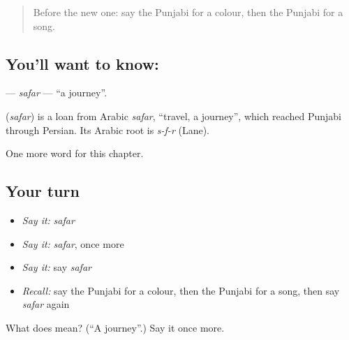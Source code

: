\label{lesson:PA-C97-safar}



\begin{quote}
Before the new one: say the Punjabi for a colour, then the Punjabi for a song.
\end{quote}

\subsection*{You'll want to know: }
\textbf{} — \emph{safar} — \textquotedblleft{}a journey\textquotedblright{}.

\begin{cousinweb}
\textbf{} (\emph{safar}) is a loan from Arabic \emph{safar}, \textquotedblleft{}travel, a journey\textquotedblright{}, which reached Punjabi through Persian. Its Arabic root is \emph{s-f-r} (Lane).
\end{cousinweb}

\begin{grammarlens}[title={What you've built}]
One more word for this chapter.
\end{grammarlens}

\subsection*{Your turn}
\begin{itemize}
\raggedright
  \item \emph{Say it:} \emph{safar}
  \item \emph{Say it:} \emph{safar}, once more
  \item \emph{Say it:} say \emph{safar}
  \item \emph{Recall:} say the Punjabi for a colour, then the Punjabi for a song, then say \emph{safar} again
\end{itemize}

\begin{tcolorbox}[breakable,colback=teal!4,colframe=teal!35!black,title={Before you move on}]
What does  mean? (\textquotedblleft{}A journey\textquotedblright{}.) Say it once more.
\end{tcolorbox}
